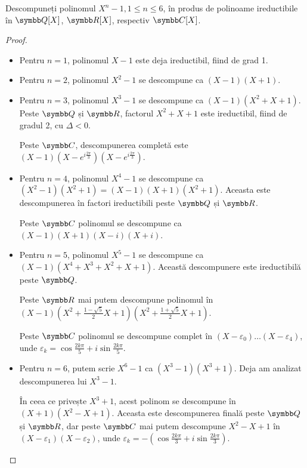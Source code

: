 \begin{exercise}[3.8]
Descompuneți polinomul \(X^{n} - 1, 1 \leq n \leq 6\), în produs de polinoame ireductibile în \(\rationals[X]\), \(\reals[X]\), respectiv \(\complex[X]\).
\end{exercise}
\begin{proof}
~
\begin{itemize}
    \item Pentru \(n = 1\), polinomul \(X - 1\) este deja ireductibil, fiind de grad 1.
    
    \item Pentru \(n = 2\), polinomul \(X^2 - 1\) se descompune ca \((X - 1)(X + 1)\).
    
    \item Pentru \(n = 3\), polinomul \(X^3 - 1\) se descompune ca \((X - 1)(X^2 + X + 1)\). Peste \(\rationals\) și \(\reals\), factorul \(X^2 + X + 1\) este ireductibil, fiind de gradul 2, cu \(\Delta < 0\).
    
    Peste \(\complex\), descompunerea completă este \((X - 1)(X - e^{i \frac{2 \pi}{3}})(X - e^{i \frac{2 \pi}{3}})\).
    
    \item Pentru \(n = 4\), polinomul \(X^4 - 1\) se descompune ca \((X^2 - 1)(X^2 + 1) = (X - 1)(X + 1)(X^2 + 1)\). Aceasta este descompunerea în factori ireductibili peste \(\rationals\) și \(\reals\).
    
    Peste \(\complex\) polinomul se descompune ca \((X - 1)(X + 1)(X - i)(X + i)\).
    
    \item Pentru \(n = 5\), polinomul \(X^5 - 1\) se descompune ca \((X - 1)(X^4 + X^3 + X^2 + X + 1)\). Această descompunere este ireductibilă peste \(\rationals\).
    
    Peste \(\reals\) mai putem descompune polinomul în \((X - 1)(X^2 + \frac{1 - \sqrt{5}}{2} X + 1)(X^2 + \frac{1 + \sqrt{5}}{2} X + 1)\).
    
    Peste \(\complex\) polinomul se descompune complet în \((X - \varepsilon_0) \dots (X - \varepsilon_4)\), unde \(\varepsilon_k = \cos \frac{2 k \pi}{5} + i \sin \frac{2 k \pi}{5}\).
    
    \item Pentru \(n = 6\), putem scrie \(X^6 - 1\) ca \((X^3 - 1)(X^3 + 1)\). Deja am analizat descompunerea lui \(X^3 - 1\).
    
    În ceea ce privește \(X^3 + 1\), acest polinom se descompune în \((X + 1)(X^2 - X + 1)\). Aceasta este descompunerea finală peste \(\rationals\) și \(\reals\), dar peste \(\complex\) mai putem descompune \(X^2 - X + 1\) în \((X - \varepsilon_1)(X - \varepsilon_2)\), unde \(\varepsilon_k = - (\cos \frac{2 k \pi}{3} + i \sin \frac{2 k \pi}{3})\).
\end{itemize}
\end{proof}

